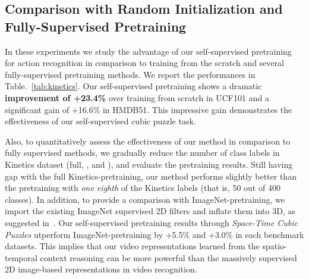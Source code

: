 \documentclass[letterpaper]{article} \usepackage{aaai19}  \usepackage{times}  \usepackage{helvet}  \usepackage{courier}  \usepackage{url}  \usepackage{graphicx}  \frenchspacing  \setlength{\pdfpagewidth}{8.5in}  \setlength{\pdfpageheight}{11in}
\newcommand{\tabref}[1]{Table.~\ref{#1}}
\begin{document}
\begin{table}
\centering
{}
\caption{\textbf{Comparison with random initialization / fully-supervised pretraining.} Top-1 accuracies on UCF101 and HMDB51. All methods use 3D ResNet-18, and the accuracies are averaged over three splits.}
\label{tab:kinetics}
\end{table}

\subsection{Comparison with Random Initialization and Fully-Supervised Pretraining}
In these experiments we study the advantage of our self-supervised pretraining for action recognition in comparison to training from the scratch and several fully-supervised pretraining methods. We report the performances in \tabref{tab:kinetics}. Our self-supervised pretraining shows a dramatic \textbf{improvement of +23.4\%} over training from scratch in UCF101 and a significant gain of +16.6\% in HMDB51. This impressive gain demonstrates the effectiveness of our self-supervised cubic puzzle task. 

Also, to quantitatively assess the effectiveness of our method in comparison to fully supervised methods, we gradually reduce the number of class labels in Kinetics dataset (full, , and ), and evaluate the pretraining results. Still having gap with the full Kinetics-pretraining, our method performs slightly better than the pretraining with \textit{one eighth} of the Kinetics labels (that is, 50 out of 400 classes). In addition, to provide a comparison with ImageNet-pretraining, we import the existing ImageNet supervised 2D filters and inflate them into 3D, as suggested in~\cite{carreira2017quo}. Our self-supervised pretraining results through \textit{Space-Time Cubic Puzzles} utperform ImageNet-pretraining by +5.5\% and +3.0\% in each benchmark datasets. This implies that our video representations learned from the spatio-temporal context reasoning can be more powerful than the massively supervised 2D image-based representations in video recognition. 
\end{document}
